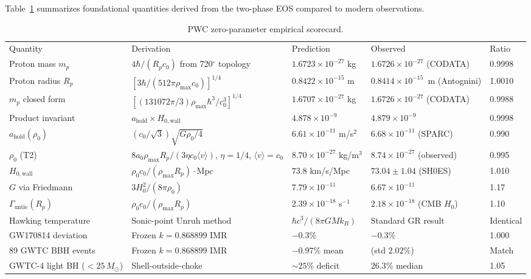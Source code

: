 \documentclass[aps,prd,twocolumn,superscriptaddress,amsmath,amssymb,nofootinbib,floatfix]{revtex4-2}
\newcommand{\amax}{a_{\text{hold}}}
\newcommand{\Msun}{M_{\odot}}
\newcommand{\rhomax}{\rho_{\max}}
\newcommand{\rhonaught}{\rho_{0}}
\newcommand{\cnaught}{c_{0}}
\newcommand{\Hwall}{H_{0,\text{wall}}}
\begin{document}
Table~\ref{tab:scorecard} summarizes foundational quantities derived from the two-phase EOS compared to modern observations.

\begin{table}[t]
\centering
\caption{PWC zero-parameter empirical scorecard.}
\label{tab:scorecard}
\begin{ruledtabular}
\begin{tabular}{lllll}
Quantity & Derivation & Prediction & Observed & Ratio \\
\colrule
Proton mass $m_p$ & $4\hbar/(R_p \cnaught)$ from 720$^{\circ}$ topology & $1.6723 \times 10^{-27}$ kg & $1.6726 \times 10^{-27}$ (CODATA) & 0.9998 \\
Proton radius $R_p$ & $[3\hbar/(512\pi \rhomax \cnaught)]^{1/4}$ & $0.8422 \times 10^{-15}$ m & $0.8414 \times 10^{-15}$~m (Antognini) & 1.0010 \\
$m_p$ closed form & $[(131072\pi/3) \rhomax \hbar^3 / \cnaught^3]^{1/4}$ & $1.6707 \times 10^{-27}$ kg & $1.6726 \times 10^{-27}$ (CODATA) & 0.9988 \\
Product invariant & $\amax \times \Hwall$ & $4.878 \times 10^{-9}$ & $4.879 \times 10^{-9}$ & 0.9998 \\
$\amax(\rhonaught)$ & $(\cnaught/\sqrt{3})\sqrt{G\rhonaught/4}$ & $6.61 \times 10^{-11}$ m/s$^2$ & $6.68 \times 10^{-11}$ (SPARC) & 0.990 \\
$\rhonaught$ (T2) & $8 a_0 \rhomax R_p / (3\eta \cnaught \langle v\rangle)$, $\eta=1/4$, $\langle v\rangle=\cnaught$ & $8.70 \times 10^{-27}$ kg/m$^3$ & $8.74 \times 10^{-27}$ (observed) & 0.995 \\
$\Hwall$ & $\rhonaught\cnaught/(\rhomax R_p)\cdot\text{Mpc}$ & $73.8$ km/s/Mpc & $73.04 \pm 1.04$ (SH0ES) & 1.010 \\
$G$ via Friedmann & $3H_0^2/(8\pi\rhonaught)$ & $7.79 \times 10^{-11}$ & $6.67 \times 10^{-11}$ & 1.17 \\
$\Gamma_{\text{untie}}(R_p)$ & $\rhonaught\cnaught/(\rhomax R_p)$ & $2.39 \times 10^{-18}$ s$^{-1}$ & $2.18 \times 10^{-18}$ (CMB $H_0$) & 1.10 \\
Hawking temperature & Sonic-point Unruh method & $\hbar c^3/(8\pi GMk_B)$ & Standard GR result & Identical \\
GW170814 deviation & Frozen $k=0.868899$ IMR & $-0.3\%$ & $-0.3\%$ & 1.000 \\
89 GWTC BBH events & Frozen $k=0.868899$ IMR & $-0.97\%$ mean & (std $2.02\%$) & Match \\
GWTC-4 light BH ($<25\,\Msun$) & Shell-outside-choke & $\sim 25\%$ deficit & $26.3\%$ median & 1.05 \\

\end{tabular}
\end{ruledtabular}
\end{table}
\end{document}

